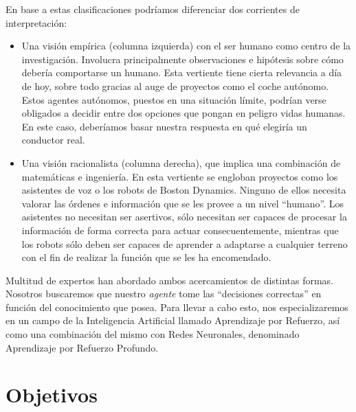 En base a estas clasificaciones podríamos diferenciar dos corrientes de interpretación:
\begin{itemize}
    \item Una visión empírica (columna izquierda) con el ser humano como centro de la investigación. Involucra principalmente observaciones e hipótesis sobre cómo debería comportarse un humano. Esta vertiente tiene cierta relevancia a día de hoy, sobre todo gracias al auge de proyectos como el coche autónomo. Estos agentes autónomos, puestos en una situación límite, podrían verse obligados a decidir entre dos opciones que pongan en peligro vidas humanas. En este caso, deberíamos basar nuestra respuesta en qué elegiría un conductor real.
    \item Una visión racionalista (columna derecha), que implica una combinación de matemáticas e ingeniería. En esta vertiente se engloban proyectos como los asistentes de voz o los robots de Boston Dynamics. Ninguno de ellos necesita valorar las órdenes e información que se les provee a un nivel ``humano''. Los asistentes no necesitan ser asertivos, sólo necesitan ser capaces de procesar la información de forma correcta para actuar consecuentemente, mientras que los robots sólo deben ser capaces de aprender a adaptarse a cualquier terreno con el fin de realizar la función que se les ha encomendado.
\end{itemize}

Multitud de expertos han abordado ambos acercamientos de distintas formas. Nosotros buscaremos que nuestro \textit{agente} tome las ``decisiones correctas'' en función del conocimiento que posea. Para llevar a cabo esto, nos especializaremos en un campo de la Inteligencia Artificial llamado Aprendizaje por Refuerzo, así como una combinación del mismo con Redes Neuronales, denominado Aprendizaje por Refuerzo Profundo.


\section{Objetivos}

